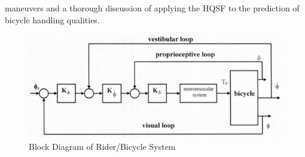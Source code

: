 \documentclass{bmd2010a}
\begin{document}
maneuvers and a thorough discussion of applying the HQSF to the prediction of
bicycle handling qualities.
\begin{figure}[tb]
    \centering
    \includegraphics[width=\columnwidth]{block.jpg}
    \caption{Block Diagram of Rider/Bicycle System}
    \label{fig:block}
\end{figure}
\end{document}
